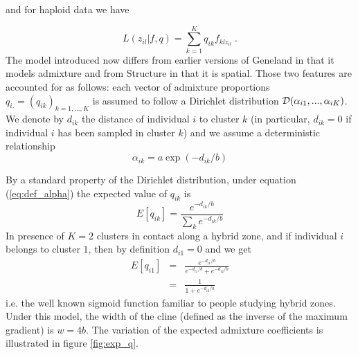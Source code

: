 \documentclass[a4paper,10pt]{article}
\begin{document}
and for haploid data we have

\begin{equation}\label{eq:admix_like}
L(z_{il} | f,q) = \sum_{k=1}^K q_{ik} f_{klz_{il}}\;.
\end{equation}
The model introduced now differs from earlier versions of {\sc Geneland} in that it  models admixture 
and from {\sc Structure} in that it is spatial. Those two features are accounted for as follows:
each vector of admixture proportions $q_{i.}=(q_{ik})_{k=1,...,K}$ is assumed to follow a  
Dirichlet distribution ${\cal D}(\alpha_{i1},...,\alpha_{iK})$.
We denote by $d_{ik}$ the distance of individual $i$ to cluster $k$ (in particular,  $d_{ik}=0$ 
if individual $i$ has been sampled in cluster $k$) 
and we assume a deterministic  relationship 
\begin{equation}\label{eq:def_alpha}
\alpha_{ik} = a\exp(-d_{ik}/b)
\end{equation}


By a standard property of the Dirichlet distribution, under equation (\ref{eq:def_alpha}) the expected value of $q_{ik}$ is 
\begin{equation}\label{eq:expect_q}
  E[q_{ik}] = \frac{e^{-d_{ik}/b}}{\sum_k e^{-d_{ik}/b}}
\end{equation}
In presence of $K=2$ clusters in contact along a hybrid zone, 
and if individual $i$ belongs to cluster $1$, 
then by definition $d_{i1}=0$ and we get 
\begin{eqnarray}
  E[q_{i1}] & = & \frac{e^{-d_{i1}/b}}{e^{-d_{i1}/b}+e^{-d_{i2}/b}} \nonumber \\
 & = & \frac{1}{1+e^{-d_{i2}/b}} \label{eq:expect_q_K=2}
\end{eqnarray}
i.e. the well known sigmoid function familiar to people studying hybrid zones.
Under this model, the width of the cline (defined as the inverse of the maximum gradient) is $w=4b$.
The variation of the expected admixture coefficients is illustrated in figure \ref{fig:exp_q}.
\end{document}
